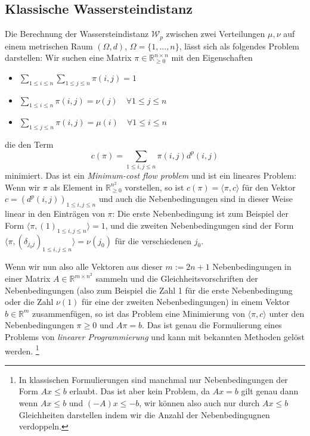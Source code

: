 \subsection{Klassische Wassersteindistanz}
Die Berechnung der Wassersteindistanz $\mathcal{W}_p$ zwischen zwei Verteilungen $\mu, \nu$ auf einem metrischen Raum $(\Omega, d)$, $\Omega=\{1,...,n\}$, lässt sich als folgendes Problem darstellen: Wir suchen eine Matrix $\pi \in \mathbb{R}_{\geq 0}^{n\times n}$ mit den Eigenschaften
\begin{itemize}
    \item $\sum_{1\leq i\leq n} \sum_{1\leq j \leq n} \pi(i,j) = 1$
    \item $\sum_{1\leq i \leq n} \pi(i,j) = \nu(j) \quad\forall 1\leq j \leq n$
    \item $\sum_{1\leq j \leq n} \pi(i,j) = \mu(i) \quad\forall 1\leq i \leq n$
\end{itemize}
die den Term
$$c(\pi) = \sum_{1\leq i,j\leq n} \pi(i,j) d^p(i,j)$$ 
minimiert. Das ist ein \emph{Minimum-cost flow problem} und ist ein lineares Problem: Wenn wir $\pi$ als Element in $\mathbb{R}_{\geq 0}^{n^2}$ vorstellen, so ist $c(\pi) = \langle \pi, c \rangle$ für den Vektor $c=(d^p(i,j))_{1\leq i,j\leq n}$ und auch die Nebenbedingungen sind in dieser Weise linear in den Einträgen von $\pi$: Die erste Nebenbedingung ist zum Beispiel der Form $\langle \pi, (1)_{1\leq i,j\leq n}\rangle = 1$, und die zweiten Nebenbedingungen sind der Form  $\langle \pi, (\delta_{j_0j})_{1\leq i,j\leq n}\rangle = \nu(j_0)$ für die verschiedenen $j_0$.

Wenn wir nun also alle Vektoren aus dieser $m:=2n+1$ Nebenbedingungen in einer Matrix $A \in \mathbb{R}^{m \times n^2}$ sammeln und die Gleichheitsvorschriften der Nebenbedingungen (also zum Beispiel die Zahl 1 für die erste Nebenbedingung oder die Zahl $\nu(1)$ für eine der zweiten Nebenbedingungen) in einem Vektor $b \in \mathbb{R}^m$ zusammenfügen, so ist das Problem eine Minimierung von $\langle \pi, c\rangle$ unter den Nebenbedingungen $\pi \geq 0$ und $A\pi = b$. Das ist genau die Formulierung eines Problems von \emph{linearer Programmierung} und kann mit bekannten Methoden gelöst werden. \footnote{In klassischen Formulierungen sind manchmal nur Nebenbedingungen der Form $Ax \leq b$ erlaubt. Das ist aber kein Problem, da $Ax=b$ gilt genau dann wenn $Ax\leq b$ und $(-A)x \leq -b$, wir können also auch nur durch $Ax \leq b$ Gleichheiten darstellen indem wir die Anzahl der Nebenbedingugnen verdoppeln. }%

